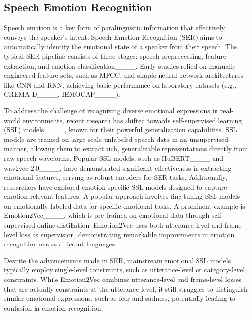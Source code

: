 \subsection{Speech Emotion Recognition}

Speech emotion is a key form of paralinguistic information that effectively conveys the speaker’s intent. Speech Emotion Recognition (SER) aims to automatically identify the emotional state of a speaker from their speech. The typical SER pipeline consists of three stages: speech preprocessing, feature extraction, and emotion classification____. Early studies relied on manually engineered feature sets, such as MFCC, and simple neural network architectures like CNN and RNN, achieving basic performance on laboratory datasets (e.g., CREMA-D____, IEMOCAP____).

To address the challenge of recognizing diverse emotional expressions in real-world environments, recent research has shifted towards self-supervised learning (SSL) models____, known for their powerful generalization capabilities. SSL models are trained on large-scale unlabeled speech data in an unsupervised manner, allowing them to extract rich, generalizable representations directly from raw speech waveforms. Popular SSL models, such as HuBERT____ and wav2vec 2.0____, have demonstrated significant effectiveness in extracting emotional features, serving as robust encoders for SER tasks. Additionally, researchers have explored emotion-specific SSL models designed to capture emotion-relevant features. A popular approach involves fine-tuning SSL models on emotionally labeled data for specific emotional tasks. A prominent example is Emotion2Vec____, which is pre-trained on emotional data through self-supervised online distillation. Emotion2Vec uses both utterance-level and frame-level loss as supervision, demonstrating remarkable improvements in emotion recognition across different languages.

Despite the advancements made in SER, mainstream emotional SSL models typically employ single-level constraints, such as utterance-level or category-level constraints. While Emotion2Vec combines utterance-level and frame-level losses that are actually constraints at the utterance level, it still struggles to distinguish similar emotional expressions, such as fear and sadness, potentially leading to confusion in emotion recognition.